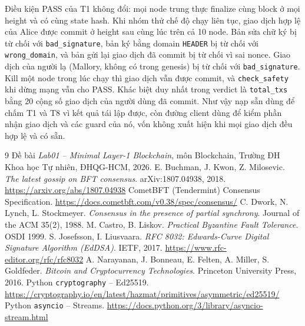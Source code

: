 \documentclass[11pt,a4paper]{article}
\newcommand{\code}[1]{\texttt{#1}}
\begin{document}
Điều kiện PASS của T1 không đổi: mọi node trung thực finalize cùng block ở mọi height và có cùng state hash. Khi nhóm thử chế độ chạy liên tục, giao dịch hợp lệ của Alice được commit ở height sau cùng lúc trên cả 10 node. Bản sửa chữ ký bị từ chối với \code{bad\_signature}, bản ký bằng domain \code{HEADER} bị từ chối với \code{wrong\_domain}, và bản gửi lại giao dịch đã commit bị từ chối vì sai nonce. Giao dịch của người lạ (Mallory, không có trong genesis) bị từ chối với \code{bad\_signature}. Kill một node trong lúc chạy thì giao dịch vẫn được commit, và \code{check\_safety} khi dừng mạng vẫn cho PASS. Khác biệt duy nhất trong verdict là \code{total\_txs} bằng 20 cộng số giao dịch của người dùng đã commit. Như vậy nạp sẵn dùng để chấm T1 và T8 vì kết quả tái lập được, còn đường client dùng để kiểm phần nhận giao dịch và các guard của nó, vốn không xuất hiện khi mọi giao dịch đều hợp lệ và có sẵn.

\begin{thebibliography}{9}\small
\setlength{\itemsep}{0pt}
 Đề bài \emph{Lab01 -- Minimal Layer-1 Blockchain}, môn Blockchain, Trường ĐH Khoa học Tự nhiên, ĐHQG-HCM, 2026.
 E. Buchman, J. Kwon, Z. Milosevic. \emph{The latest gossip on BFT consensus}. arXiv:1807.04938, 2018. \url{https://arxiv.org/abs/1807.04938}
 CometBFT (Tendermint) Consensus Specification. \url{https://docs.cometbft.com/v0.38/spec/consensus/}
 C. Dwork, N. Lynch, L. Stockmeyer. \emph{Consensus in the presence of partial synchrony}. Journal of the ACM 35(2), 1988.
 M. Castro, B. Liskov. \emph{Practical Byzantine Fault Tolerance}. OSDI 1999.
 S. Josefsson, I. Liusvaara. \emph{RFC 8032: Edwards-Curve Digital Signature Algorithm (EdDSA)}. IETF, 2017. \url{https://www.rfc-editor.org/rfc/rfc8032}
 A. Narayanan, J. Bonneau, E. Felten, A. Miller, S. Goldfeder. \emph{Bitcoin and Cryptocurrency Technologies}. Princeton University Press, 2016.
 Python \code{cryptography} -- Ed25519. \url{https://cryptography.io/en/latest/hazmat/primitives/asymmetric/ed25519/}
 Python \code{asyncio} -- Streams. \url{https://docs.python.org/3/library/asyncio-stream.html}
\end{thebibliography}
\end{document}
